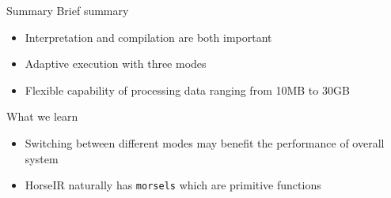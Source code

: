 \begin{frame}{Summary}
Brief summary
\begin{itemize}
\item Interpretation and compilation are both important
\item Adaptive execution with three modes
\item Flexible capability of processing data ranging from 10MB to 30GB
\end{itemize}
\pause
What we learn
\begin{itemize}
\item Switching between different modes may benefit the performance of overall system
\item HorseIR naturally has \texttt{morsels} which are primitive functions
\end{itemize}
\end{frame}
